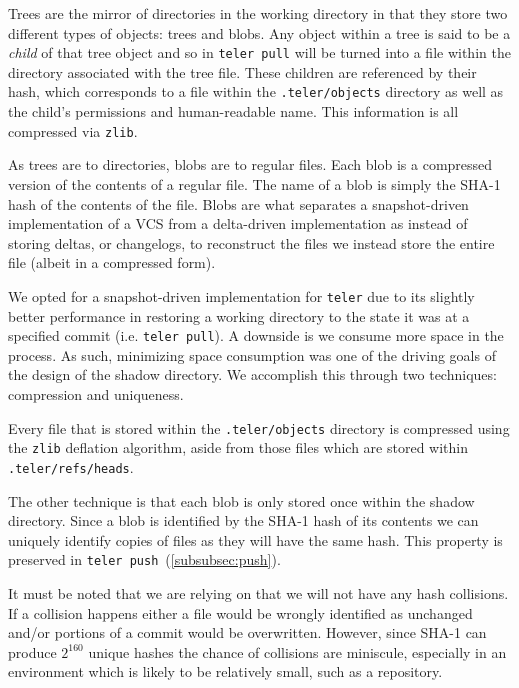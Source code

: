 \documentclass[12pt, letterpaper]{article}
\begin{document}
\begin{multicols}{2}
  Trees are the mirror of directories in the working directory in that
  they store two different types of objects: trees and blobs. Any
  object within a tree is said to be a \textit{child} of that tree
  object and so in \texttt{teler pull} will be turned into a file
  within the directory associated with the tree file. These children
  are referenced by their hash, which corresponds to a file within the
  \texttt{.teler/objects} directory as well as the child's permissions
  and human-readable name. This information is all compressed via
  \texttt{zlib}.

  As trees are to directories, blobs are to regular files. Each blob
  is a compressed version of the contents of a regular file. The name
  of a blob is simply the SHA-1 hash of the contents of the file.
  Blobs are what separates a snapshot-driven implementation of a VCS
  from a delta-driven implementation as instead of storing deltas, or
  changelogs, to reconstruct the files we instead store the entire
  file (albeit in a compressed form).

  We opted for a snapshot-driven implementation for \texttt{teler} due
  to its slightly better performance in restoring a working directory
  to the state it was at a specified commit (i.e. \texttt{teler
    pull}). A downside is we consume more space in the process. As
  such, minimizing space consumption was one of the driving goals of
  the design of the shadow directory. We accomplish this through two
  techniques: compression and uniqueness.

  Every file that is stored within the \texttt{.teler/objects}
  directory is compressed using the \texttt{zlib} deflation algorithm,
  aside from those files which are stored within
  \texttt{.teler/refs/heads}.

  The other technique is that each blob is only stored once within the
  shadow directory. Since a blob is identified by the SHA-1 hash of
  its contents we can uniquely identify copies of files as they will
  have the same hash. This property is preserved in \texttt{teler
    push}~(\ref{subsubsec:push}).

  It must be noted that we are relying on that we will not have any
  hash collisions. If a collision happens either a file would be
  wrongly identified as unchanged and/or portions of a commit would be
  overwritten. However, since SHA-1 can produce $2^{160}$ unique
  hashes the chance of collisions are miniscule, especially in an
  environment which is likely to be relatively small, such as a
  repository.


\end{multicols}
\end{document}
